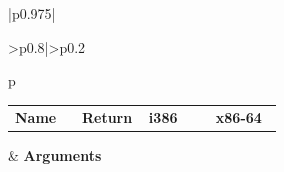 \documentclass{article}
\begin{document}
\setlength{\tabcolsep}{0pt}
\begin{longtable}{|p{0.975\linewidth}|}
  \hline \begin{tabular}[t]{>{\centering\arraybackslash}p{0.8\linewidth}|>{\centering\arraybackslash}p{0.2\linewidth}}
    \begin{tabular}[t]{p{\linewidth}}
      \begin{tabular}[t]{*{3}{>{\centering\arraybackslash}p{0.249\linewidth}|}>{\centering\arraybackslash}p{0.249\linewidth}}
        \textbf{Name} & \textbf{Return} & \textbf{i386} & \textbf{x86-64}
      \end{tabular}
    \end{tabular} & \textbf{Arguments}
  \end{tabular} \\ \hline
  \endhead


\end{longtable}
\end{document}
